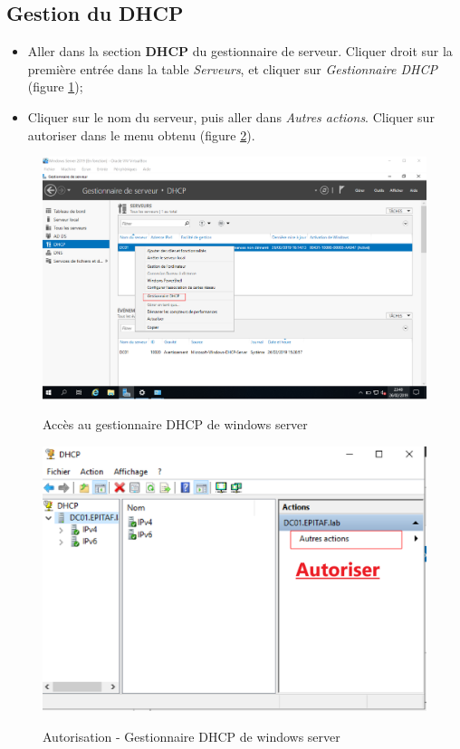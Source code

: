 \subsection{Gestion du DHCP}

\begin{itemize}
    \item Aller dans la section \textbf{DHCP} du gestionnaire de serveur. Cliquer droit sur la première entrée dans la table \textit{Serveurs}, et cliquer sur \textit{Gestionnaire DHCP} (figure \ref{Funcs_WinS/7});
    \item Cliquer sur le nom du serveur, puis aller dans \textit{Autres actions}. Cliquer sur autoriser dans le menu obtenu (figure \ref{Funcs_WinS/8}).
\end{itemize}

\begin{figure}[h!]
	\begin{center}
		\caption{Accès au gestionnaire DHCP de windows server}
		\includegraphics[scale=0.5]{WS_Screenshots/35.png}
		\label{Funcs_WinS/7}
	\end{center}
\end{figure}
\FloatBarrier 
    

\begin{figure}[h!]
	\begin{center}
		\caption{Autorisation - Gestionnaire DHCP de windows server}
		\includegraphics[scale=0.3]{WS_Screenshots/36.png}
		\label{Funcs_WinS/8}
	\end{center}
\end{figure}
\FloatBarrier 
    
